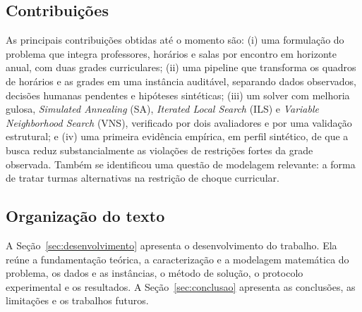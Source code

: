 \subsection{Contribuições}
\label{subsec:contribuicoes}

As principais contribuições obtidas até o momento são: (i) uma formulação do problema que integra professores, horários e salas por encontro em horizonte anual, com duas grades curriculares; (ii) uma pipeline que transforma os quadros de horários e as grades em uma instância auditável, separando dados observados, decisões humanas pendentes e hipóteses sintéticas; (iii) um solver com melhoria gulosa, \textit{Simulated Annealing} (SA), \textit{Iterated Local Search} (ILS) e \textit{Variable Neighborhood Search} (VNS), verificado por dois avaliadores e por uma validação estrutural; e (iv) uma primeira evidência empírica, em perfil sintético, de que a busca reduz substancialmente as violações de restrições fortes da grade observada. Também se identificou uma questão de modelagem relevante: a forma de tratar turmas alternativas na restrição de choque curricular.

\subsection{Organização do texto}
\label{subsec:organizacao}

A Seção~\ref{sec:desenvolvimento} apresenta o desenvolvimento do trabalho. Ela reúne a fundamentação teórica, a caracterização e a modelagem matemática do problema, os dados e as instâncias, o método de solução, o protocolo experimental e os resultados. A Seção~\ref{sec:conclusao} apresenta as conclusões, as limitações e os trabalhos futuros.
